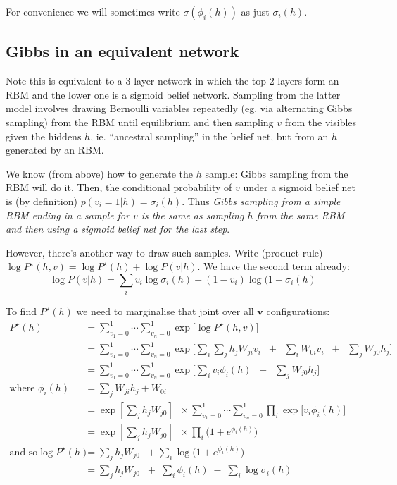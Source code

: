 \documentclass{article}
\begin{document}
For convenience we will sometimes write \(\sigma(\phi_i(h))\) as just
\(\sigma_i(h)\).

    \subsection{Gibbs in an equivalent
network}\label{gibbs-in-an-equivalent-network}

Note this is equivalent to a 3 layer network in which the top 2 layers
form an RBM and the lower one is a sigmoid belief network. Sampling from
the latter model involves drawing Bernoulli variables repeatedly (eg.
via alternating Gibbs sampling) from the RBM until equilibrium and then
sampling \(v\) from the visibles given the hiddens \(h\), ie.
``ancestral sampling'' in the belief net, but from an \(h\) generated by
an RBM.

We know (from above) how to generate the \(h\) sample: Gibbs sampling
from the RBM will do it. Then, the conditional probability of \(v\)
under a sigmoid belief net is (by definition)
\(p(v_i=1|h) = \sigma_i(h)\). Thus \emph{Gibbs sampling from a simple
RBM ending in a sample for \(v\) is the same as sampling \(h\) from the
same RBM and then using a sigmoid belief net for the last step}.

However, there's another way to draw such samples. Write (product rule)
\(\log P^\star(h,v) = \log P^\star(h) + \log P(v|h)\). We have the
second term already:
\[ \log P(v|h) = \sum_i v_i \log \sigma_i(h) + (1-v_i) \log (1 - \sigma_i(h)\]

    To find \(P^\star(h)\) we need to marginalise that joint over all
\(\mathbf{v}\) configurations:
\[\begin{align} P^\star(h) &= \sum_{v_1=0}^1 \cdots \sum_{v_n=0}^1 \exp \bigg[  \log P^{\star}(h,v) \bigg] \\
&= \sum_{v_1=0}^1 \cdots \sum_{v_n=0}^1 \exp \bigg[  \sum_i  \sum_j h_j W_{ji} v_i \;\; + \;\; \sum_i W_{0i} v_i \;\; + \;\; \sum_j W_{j0} h_j \bigg] \\
&= \sum_{v_1=0}^1 \cdots \sum_{v_n=0}^1 \exp \bigg[  \sum_i v_i \phi_i(h)  \;\; + \;\; \sum_j W_{j0} h_j \bigg] \\
\text{where } \phi_i(h) &= \sum_j W_{ji} h_j + W_{0i} \\
&= \exp\left[ \sum_j h_j  W_{j0} \right] \;\; \times \sum_{v_1=0}^1 \cdots \sum_{v_n=0}^1 \prod_i \exp\bigg[ v_i \phi_i(h) \bigg] \\
&= \exp\left[\sum_j h_j  W_{j0}\right] \;\; \times \prod_i \bigg( 1 + e^{\phi_i(h) } \bigg) \\
\text{and so}
\log P^\star(h) &= \sum_j h_j  W_{j0} \;\; +  \sum_i \log \bigg( 1 + e^{\phi_i(h) } \bigg)
\\
&= \sum_j h_j  W_{j0} \;\; + \; \sum_i \phi_i(h) \;  - \; \sum_i \log \sigma_i(h) 
\end{align} \]
\end{document}

